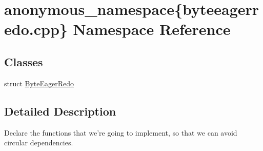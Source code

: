 \hypertarget{namespaceanonymous__namespace_02byteeagerredo_8cpp_03}{\section{anonymous\-\_\-namespace\{byteeagerredo.\-cpp\} Namespace Reference}
\label{namespaceanonymous__namespace_02byteeagerredo_8cpp_03}
}
\subsection*{Classes}
\begin{DoxyCompactItemize}
\item 
struct \hyperlink{structanonymous__namespace_02byteeagerredo_8cpp_03_1_1ByteEagerRedo}{Byte\-Eager\-Redo}
\end{DoxyCompactItemize}


\subsection{Detailed Description}
Declare the functions that we're going to implement, so that we can avoid circular dependencies. 